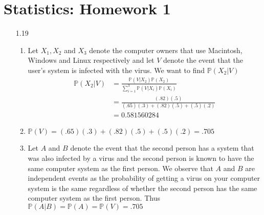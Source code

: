 \documentclass[a4paper,10pt]{article}
\theoremstyle{definition}
\begin{document}
\section*{Statistics: Homework 1}

\begin{enumerate}
\item[1.19] 
\begin{enumerate}
\item Let $X_1, X_2$ and $X_3$ denote the computer owners that use Macintosh, Windows and Linux respectively and let $V$ denote the event that the user's system is infected with the virus. We want to find $\mathbb{P}(X_2 | V)$
\begin{align*}
\mathbb{P}(X_2 | V) &= \frac{\mathbb{P}(V|X_2)\mathbb{P}(X_2)}{\sum_{i=1}^{3}\mathbb{P}(V|X_i)\mathbb{P}(X_i)}\\
&=\frac{(.82)(.5)}{(.65)(.3)+(.82)(.5)+(.5)(.2)}\\
&=0.581560284
\end{align*}
\item $\mathbb{P}(V) = (.65)(.3)+(.82)(.5)+(.5)(.2) = .705 $
\item Let $A$ and $B$ denote the event that the second person has a system that was also infected by a virus and the second person is known to have the same computer system as the first person. We observe that $A$ and $B$ are independent events as the probability of getting a virus on your computer system is the same regardless of whether the second person has the same computer system as the first person. Thus $\mathbb{P}(A|B) = \mathbb{P}(A) = \mathbb{P}(V) = .705$


\end{enumerate}
\end{enumerate}
\end{document}
